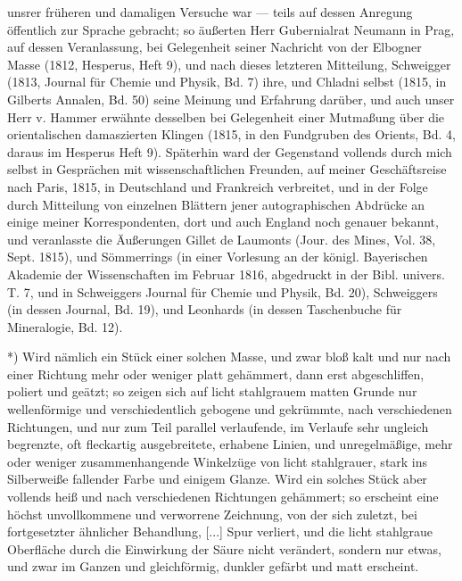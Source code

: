 \documentclass[a4paper, 11pt, oneside, german]{article}
\begin{document}
unsrer früheren und damaligen Versuche war --- teils auf dessen Anregung öffentlich zur Sprache gebracht; so äußerten Herr Gubernialrat Neumann in Prag, auf dessen Veranlassung, bei Gelegenheit seiner Nachricht von der Elbogner Masse (1812, Hesperus, Heft 9), und nach dieses letzteren Mitteilung, Schweigger (1813, Journal für Chemie und Physik, Bd. 7) ihre, und Chladni selbst (1815, in Gilberts Annalen, Bd. 50) seine Meinung und Erfahrung darüber, und auch unser Herr v. Hammer erwähnte desselben bei Gelegenheit einer Mutmaßung über die orientalischen damaszierten Klingen (1815, in den Fundgruben des Orients, Bd. 4, daraus im Hesperus Heft 9). Späterhin ward der Gegenstand vollends durch mich selbst in Gesprächen mit wissenschaftlichen Freunden, auf meiner Geschäftsreise nach Paris, 1815, in Deutschland und Frankreich verbreitet, und in der Folge durch Mitteilung von einzelnen Blättern jener autographischen Abdrücke an einige meiner Korrespondenten, dort und auch England noch genauer bekannt, und veranlasste die Äußerungen Gillet de Laumonts (Jour. des Mines, Vol. 38, Sept. 1815), und Sömmerrings (in einer Vorlesung an der königl. Bayerischen Akademie der Wissenschaften im Februar 1816, abgedruckt in der Bibl. univers. T. 7, und in Schweiggers Journal für Chemie und Physik, Bd. 20), Schweiggers (in dessen Journal, Bd. 19), und Leonhards (in dessen Taschenbuche für Mineralogie, Bd. 12).

*) Wird nämlich ein Stück einer solchen Masse, und zwar bloß kalt und nur nach einer Richtung mehr oder weniger platt gehämmert, dann erst abgeschliffen, poliert und geätzt; so zeigen sich auf licht stahlgrauem matten Grunde nur wellenförmige und verschiedentlich gebogene und gekrümmte, nach verschiedenen Richtungen, und nur zum Teil parallel verlaufende, im Verlaufe sehr ungleich begrenzte, oft fleckartig ausgebreitete, erhabene Linien, und unregelmäßige, mehr oder weniger zusammenhangende Winkelzüge von licht stahlgrauer, stark ins Silberweiße fallender Farbe und einigem Glanze. Wird ein solches Stück aber vollends heiß und nach verschiedenen Richtungen gehämmert; so erscheint eine höchst unvollkommene und verworrene Zeichnung, von der sich zuletzt, bei fortgesetzter ähnlicher Behandlung, [...] Spur verliert, und die licht stahlgraue Oberfläche durch die Einwirkung der Säure nicht verändert, sondern nur etwas, und zwar im Ganzen und gleichförmig, dunkler gefärbt und matt erscheint.
\end{document}
